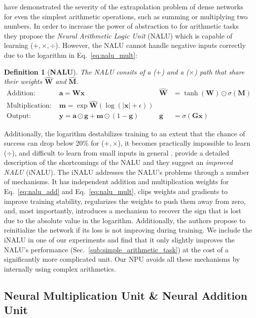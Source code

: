 \documentclass[9pt]{article}
\newtheorem*{definition}{Definition}
\begin{document}
\citet{trask_neural_2018} have demonstrated the severity of the extrapolation
problem of dense networks for even the simplest arithmetic operations, such as
summing or multiplying two numbers.  In order to increase the power of
abstraction to for arithmetic tasks they propose the \emph{Neural Arithmetic
Logic Unit} (NALU) which is capable of learning ($+,\times,\div$).  However,
the NALU cannot handle negative inputs correctly due to the logarithm in
Eq.~\ref{eq:nalu_mult}:
\begin{definition}[{\bf NALU}]
  The NALU consits of a ($+$) and a ($\times$) path that share their weights $\bm{\hat{W}}$ and $\bm{\hat{M}}$.
\begin{align}
  \label{eq:nalu_add}
  \text{Addition: }       & \bm a = \bm W \bm x
                          & \bm{\hat W}& = \tanh(\bm{W}) \odot \sigma(\bm{M}) \\
  \label{eq:nalu_mult}
  \text{Multiplication: } & \bm m = \exp \bm{\hat W}(\log(|\bm x|+\epsilon)) & &\\
  \text{Output: }         & \bm y = \bm a \odot \bm g + \bm m \odot (1-\bm g) 
                          & \bm g& = \sigma(\bm G\bm x)
\end{align}
\end{definition}
Additionally, the logarithm destabilizes training to an extent that the chance of success
can drop below 20\% for ($+,\times$), it becomes practically impossible to
learn ($\div$), and difficult to learn from small inputs in general
\citep{madsen_measuring_2019}.
\cite{schlor_inalu_2020} provide a detailed description of the shortcomings of
the NALU and they suggest an \emph{improved NALU} (iNALU).  The iNALU addresses
the NALU's problems through a number of mechanisms.  It has independent
addition and multiplication weights for Eq.~\ref{eq:nalu_add} and
Eq.~\ref{eq:nalu_mult}, clips weights and gradients to improve training
stability, regularizes the weights to push them away from zero, and, most
importantly, introduces a mechanism to recover the sign that is lost due to the
absolute value in the logarithm. Additionally, the authors propose to
reinitialize the network if its loss is not improving during training.  We
include the iNALU in one of our experiments and find that it only slightly
improves the NALU's performance (Sec.~\ref{sub:simple_arithmetic_task}) at the
cost of a significantly more complicated unit. Our NPU avoids all these mechanisms
by internally using complex arithmetics.

\subsection{Neural Multiplication Unit \& Neural Addition Unit}%
\label{sub:neural_multiplication_unit}
\end{document}
